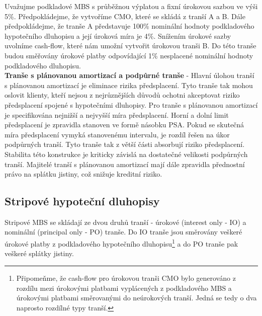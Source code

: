 \documentclass[a4paper]{book}
\begin{document}
Uvažujme podkladové MBS s průběžnou výplatou a fixní úrokovou sazbou ve výši 5\%. Předpokládejme, že vytvoříme CMO, které se skládá z tranší A a B. Dále předpokládejme, že tranše A představuje 100\% nominální hodnoty podkladového hypotečního dluhopisu a její úroková míra je 4\%. Snížením úrokové sazby uvolníme cash-flow, které nám umožní vytvořit úrokovou tranši B. Do této tranše budou směřovány úrokové platby odpovídající 1\% nesplacené nominální hodnoty podkladového dluhopisu.\\

\noindent \textbf{Tranše s plánovanou amortizací a podpůrné tranše} - Hlavní úlohou tranší s plánovanou amortizací je eliminace rizika předsplacení. Tyto tranše tak mohou oslovit klienty, kteří nejsou z nejrůznějších důvodů ochotni akceptovat riziko předsplacení spojené s hypotečními dluhopisy. Pro tranše s plánovanou amortizací je specifikována nejnižší a nejvyšší míra předsplacení. Horní a dolní limit předsplacení je zpravidla stanoven ve formě násobku PSA. Pokud se skutečná míra předsplacení vymyká stanovenému intervalu, je rozdíl řešen na úkor podpůrných tranší. Tyto tranše tak z větší části absorbují riziko předsplacení. Stabilita této konstrukce je kriticky závislá na dostatečné velikosti podpůrných tranší. Majitelé tranší s plánovanou amortizací mají dále zpravidla přednostní právo na splátku jistiny, což snižuje kreditní riziko.

\subsection{Stripové hypoteční dluhopisy}

Stripové MBS se skládají ze dvou druhů tranší - úrokové (interest only - IO) a nominální (principal only - PO) tranše. Do IO tranše jsou směrovány veškeré úrokové platby z podkladového hypotečního dluhopisu\footnote{Připomeňme, že cash-flow pro úrokovou tranši CMO bylo generováno z rozdílu mezi úrokovými platbami vyplácených z podkladového MBS a úrokovými platbami směrovanými do neúrokových tranší. Jedná se tedy o dva naprosto rozdílné typy tranší.} a do PO tranše pak veškeré splátky jistiny.
\end{document}
